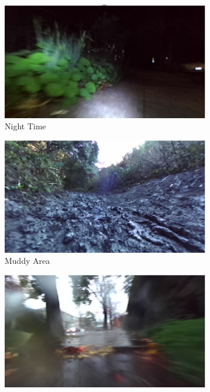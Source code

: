 {\begin{figure}[!th]
\begin{subfigure}{0.3\textwidth}
       \centering
       \includegraphics[width=\linewidth]{paper/content/images/night}
       \caption{Night Time}
     \end{subfigure}
        \begin{subfigure}{0.3\textwidth}
       \centering
       \includegraphics[width=\linewidth]{paper/content/images/muddy}
       \caption{Muddy Area}
    \end{subfigure}
    \begin{subfigure}{0.3\textwidth}
       \centering
       \includegraphics[width=\linewidth]{paper/content/images/rainy}

\end{subfigure}
\end{figure}}

